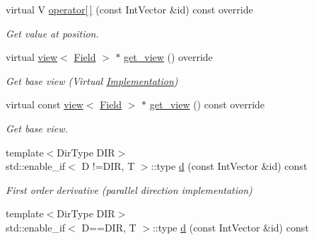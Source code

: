 \begin{DoxyCompactItemize}
virtual V \hyperlink{classUintah_1_1PhaseField_1_1detail_1_1bc__fd_3_01ScalarField_3_01T_01_4_00_01STN_00_01NC_00_01F_00_01BC_1_1Neumann_00_011_01_4_a4d5cce009d33d31c9c01e05c01d37cc3}{operator\mbox{[}$\,$\mbox{]}} (const Int\+Vector \&id) const override
\begin{DoxyCompactList}\small\item\em Get value at position. \end{DoxyCompactList}\item 
virtual \hyperlink{classUintah_1_1PhaseField_1_1detail_1_1view}{view}$<$ \hyperlink{structUintah_1_1PhaseField_1_1ScalarField}{Field} $>$ $\ast$ \hyperlink{classUintah_1_1PhaseField_1_1detail_1_1bc__fd_3_01ScalarField_3_01T_01_4_00_01STN_00_01NC_00_01F_00_01BC_1_1Neumann_00_011_01_4_acd326fe71c0df45ad7fccd480a29da8e}{get\+\_\+view} () override
\begin{DoxyCompactList}\small\item\em Get base view (Virtual \hyperlink{classUintah_1_1PhaseField_1_1Implementation}{Implementation}) \end{DoxyCompactList}\item 
virtual const \hyperlink{classUintah_1_1PhaseField_1_1detail_1_1view}{view}$<$ \hyperlink{structUintah_1_1PhaseField_1_1ScalarField}{Field} $>$ $\ast$ \hyperlink{classUintah_1_1PhaseField_1_1detail_1_1bc__fd_3_01ScalarField_3_01T_01_4_00_01STN_00_01NC_00_01F_00_01BC_1_1Neumann_00_011_01_4_a54dca99f90e96dabfffe594538bd5ca8}{get\+\_\+view} () const override
\begin{DoxyCompactList}\small\item\em Get base view. \end{DoxyCompactList}\item 
{\footnotesize template$<$Dir\+Type D\+IR$>$ }\\std\+::enable\+\_\+if$<$ D !=D\+IR, T $>$\+::type \hyperlink{classUintah_1_1PhaseField_1_1detail_1_1bc__fd_3_01ScalarField_3_01T_01_4_00_01STN_00_01NC_00_01F_00_01BC_1_1Neumann_00_011_01_4_a50bec25e8d3126b0b9fa2cc64384e1b9}{d} (const Int\+Vector \&id) const
\begin{DoxyCompactList}\small\item\em First order derivative (parallel direction implementation) \end{DoxyCompactList}\item 
{\footnotesize template$<$Dir\+Type D\+IR$>$ }\\std\+::enable\+\_\+if$<$ D==D\+IR, T $>$\+::type \hyperlink{classUintah_1_1PhaseField_1_1detail_1_1bc__fd_3_01ScalarField_3_01T_01_4_00_01STN_00_01NC_00_01F_00_01BC_1_1Neumann_00_011_01_4_a926e64240794eb45ef08980249e93384}{d} (const Int\+Vector \&id) const

\end{DoxyCompactItemize}
